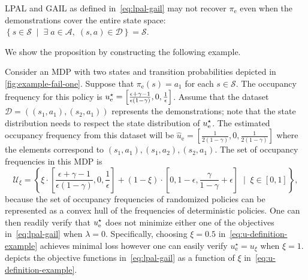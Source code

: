 \begin{proposition}
LPAL and GAIL as defined in~\eqref{eq:lpal-gail} may not recover $\pi_{\mathrm{e}}$ even when the demonstrations cover the entire state space: $ \left\{ s\in \mathcal{S} \; \mid \; \exists\; a\in \mathcal{A}, \; (s,a) \in \mathcal{D} \right\} = \mathcal{S}$. 
\end{proposition}
We show the proposition by constructing the following example.
\begin{example} \label{exm:fail-all}
Consider an MDP with two states and transition probabilities depicted in \cref{fig:example-fail-one}. Suppose that $\pi_{\mathrm{e}}(s) = a_1$ for each $s\in \mathcal{S}$.  The occupancy frequency for this policy is $u^{\star}_{\mathrm{e}} = \left[ \frac{\epsilon + \gamma - 1}{\epsilon(1-\gamma)}, 0, \frac{1}{\epsilon}\right]$. Assume that the dataset $\mathcal{D} = ( (s_1, a_1), (s_2, a_1) )$ represents the demonstrations; note that the state distribution needs to respect the state distribution of $u_{\mathrm{e}}^{\star} $. The estimated occupancy frequency from this dataset will be $\hat{u}_{\mathrm{e}} = \left[\frac{1}{2(1-\gamma)}, 0, \frac{1}{2(1-\gamma)}\right]$ where the elements correspond to $(s_1, a_1), (s_1, a_2), (s_2,a_1)$. The set of occupancy frequencies in this MDP is
\begin{equation} \label{eq:u-definition-example}
  \mathcal{U}_\xi = \left\{ \xi \cdot \left[\frac{\epsilon+\gamma-1}{\epsilon(1-\gamma)}, 0, \frac{1}{\epsilon}\right] + (1-\xi) \cdot \left[0,1-\epsilon,\frac{\gamma}{1-\gamma}+\epsilon\right] \;\mid\; \xi \in [0,1]\right\},
\end{equation}
because the set of occupancy frequencies of randomized policies can be represented as a convex hull of the frequencies of deterministic policies. One can then readily verify that $u_{\mathrm{e}}^{\star} $ does not minimize either one of the objectives in~\eqref{eq:lpal-gail} when $\lambda = 0$. Specifically, choosing $\xi = 0.5$ in~\eqref{eq:u-definition-example} achieves minimal loss however one can easily verify $u^\star_{\mathrm{e}} = u_\xi$ when $\xi = 1$.  depicts the objective functions in~\eqref{eq:lpal-gail} as a function of $\xi$ in~\eqref{eq:u-definition-example}.
\end{example}

